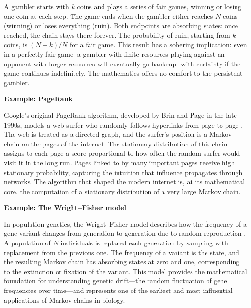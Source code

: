 \medskip

A gambler starts with $k$ coins and plays a series of fair games, winning or losing one coin at each step. The game ends when the gambler either reaches $N$ coins (winning) or loses everything (ruin). Both endpoints are absorbing states: once reached, the chain stays there forever. The probability of ruin, starting from $k$ coins, is $(N-k)/N$ for a fair game. This result has a sobering implication: even in a perfectly fair game, a gambler with finite resources playing against an opponent with larger resources will eventually go bankrupt with certainty if the game continues indefinitely. The mathematics offers no comfort to the persistent gambler.

\medskip

\textbf{Example: PageRank}

\medskip

Google's original PageRank algorithm, developed by Brin and Page in the late 1990s, models a web surfer who randomly follows hyperlinks from page to page \cite{brin_1998_pagerank}. The web is treated as a directed graph, and the surfer's position is a Markov chain on the pages of the internet. The stationary distribution of this chain assigns to each page a score proportional to how often the random surfer would visit it in the long run. Pages linked to by many important pages receive high stationary probability, capturing the intuition that influence propagates through networks. The algorithm that shaped the modern internet is, at its mathematical core, the computation of a stationary distribution of a very large Markov chain.

\medskip

\textbf{Example: The Wright--Fisher model}

\medskip

In population genetics, the Wright--Fisher model describes how the frequency of a gene variant changes from generation to generation due to random reproduction \cite{ewens_2004_genetics}. A population of $N$ individuals is replaced each generation by sampling with replacement from the previous one. The frequency of a variant is the state, and the resulting Markov chain has absorbing states at zero and one, corresponding to the extinction or fixation of the variant. This model provides the mathematical foundation for understanding genetic drift---the random fluctuation of gene frequencies over time---and represents one of the earliest and most influential applications of Markov chains in biology.


